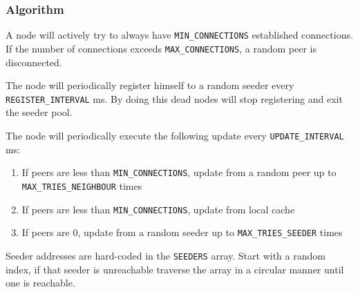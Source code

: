 \documentclass[../documentation.tex]{subfiles}
\begin{document}
\subsubsection{Algorithm}

A node will actively try to always have \texttt{MIN\_CONNECTIONS} established connections.
If the number of connections exceeds \texttt{MAX\_CONNECTIONS}, a random peer is disconnected.

The node will periodically register himself to a random seeder every \texttt{REGISTER\_INTERVAL} ms.
By doing this dead nodes will stop registering and exit the seeder pool.

The node will periodically execute the following update every \texttt{UPDATE\_INTERVAL} ms:

\begin{enumerate}
    \item If peers are less than \texttt{MIN\_CONNECTIONS}, update from a random peer up to \texttt{MAX\_TRIES\_NEIGHBOUR} times
    \item If peers are less than \texttt{MIN\_CONNECTIONS}, update from local cache
    \item If peers are \(0\), update from a random seeder up to \texttt{MAX\_TRIES\_SEEDER} times
\end{enumerate}

\pagebreak

Seeder addresses are hard-coded in the \texttt{SEEDERS} array.
Start with a random index, if that seeder is unreachable traverse the array in a circular manner
until one is reachable.


\begin{center}
\end{center}


\pagebreak
\end{document}
